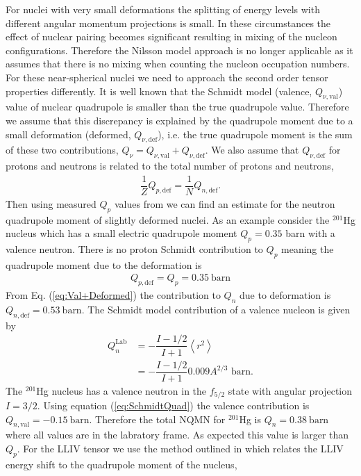 \documentclass[10pt,a4paper, twoside, openright]{report}
\begin{document}
For nuclei with very small deformations the splitting of energy levels with different angular momentum projections is small.
 In these circumstances the effect of nuclear pairing becomes significant resulting in mixing of the nucleon configurations. Therefore the Nilsson model approach is no longer applicable as it assumes that there is no mixing when counting the nucleon occupation numbers. For these near-spherical nuclei we need to approach the second order tensor properties differently.  It is well known that the Schmidt model (valence, $Q_{\nu, \text{val}}$) value of nuclear quadrupole is smaller than the true quadrupole value. Therefore we assume that this discrepancy is explained by the quadrupole moment due to a small deformation (deformed, $Q_{\nu, \text{def}}$), i.e. the true quadrupole moment is the sum of these two contributions, $Q_{\nu} = Q_{\nu, \text{val}} + Q_{\nu, \text{def}}$. We also assume that $Q_{\nu,\text{def}}$ for protons and neutrons is related to the total number of protons and neutrons,
\begin{align} \label{eq:Val+Deformed}
\dfrac{1}{Z}Q_{p, \text{def}} = \dfrac{1}{N}Q_{n,\text{def}}.
\end{align}
Then using measured $Q_{p}$ values from \cite{Stone2005} we can find an estimate for the neutron quadrupole moment of slightly deformed nuclei. As an example consider the $^{201}$Hg nucleus which has a small electric quadrupole moment $Q_{p} = 0.35 $ barn with a valence neutron. There is no proton Schmidt contribution to $Q_{p}$ meaning the quadrupole moment due to the deformation is 
\begin{align*}
Q_{p,\text{def}} = Q_{p} = 0.35 \ \text{barn}
\end{align*}
From Eq. (\ref{eq:Val+Deformed}) the contribution to $Q_{n}$ due to deformation is $Q_{n,\text{def}} = 0.53 \ \text{barn}$. The Schmidt model contribution of a valence nucleon is given by \cite{BohrMottVol1, Flambaum2016}
\begin{align} \label{eq:SchmidtQuad}
Q_{n}^{\text{Lab}} &= -\dfrac{I - 1/2}{I + 1}\left<r^2\right> \\
&= -\dfrac{I - 1/2}{I + 1}0.009A^{2/3} \text{ barn}.
\end{align}
 The $^{201}$Hg nucleus has a valence neutron in the $f_{5/2}$ state with angular projection $I =3/2$. Using equation (\ref{eq:SchmidtQuad}) the valence contribution is $Q_{n,\text{val}} = -0.15 \ \text{barn}$. Therefore the total NQMN for $^{201}$Hg is $Q_{n} = 0.38 \ \text{barn}$ where all values are in the labratory frame. As expected this value is larger than $Q_{p}$. For the LLIV tensor we use the method outlined in \cite{Flambaum2016} which relates the LLIV energy shift to the quadrupole moment of the nucleus,
\end{document}
